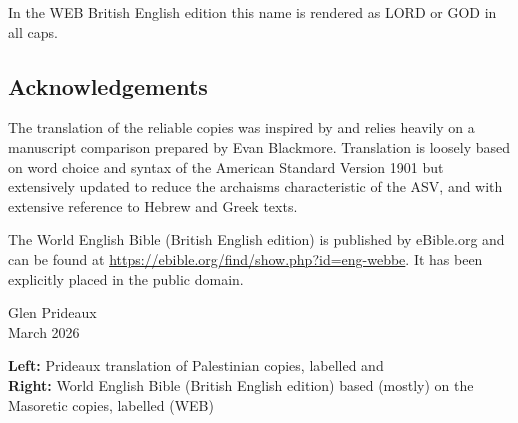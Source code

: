 {In the WEB British English edition this name is rendered as LORD or
GOD in all caps.


\subsection*{Acknowledgements}

The translation of the reliable copies was inspired by and relies heavily on a manuscript comparison
prepared by Evan Blackmore. Translation is loosely based on word choice
and syntax of the American Standard Version 1901 but extensively updated
to reduce the archaisms characteristic of the ASV, and with extensive
reference to Hebrew and Greek texts.

The World English Bible (British English edition) is published by eBible.org and can be found at
\href{https://ebible.org/find/show.php?id=eng-webbe}{https://ebible.org/find/show.php?id=eng-webbe}. It
has been explicitly placed in the public domain.

} %

\bigskip
\noindent Glen Prideaux\\
March 2026

\bigskip
\noindent\textbf{Left:} Prideaux translation of Palestinian copies,
labelled  and\\
\textbf{Right:} World English Bible (British English edition) based (mostly) on the Masoretic copies,
labelled {\small (WEB)}